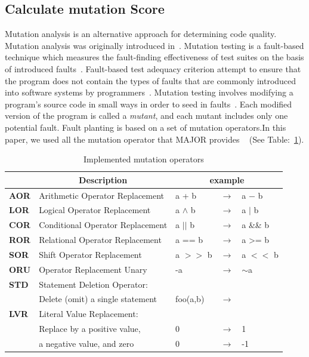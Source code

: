 \documentclass[conference]{IEEEtran}
\begin{document}
\subsection{Calculate mutation Score}
Mutation analysis is an alternative approach for determining code quality. Mutation analysis was originally introduced in~\cite{demillo1978hints,budd1980mutation}. Mutation testing is a fault-based technique which measures the fault-finding effectiveness of test suites on the basis of introduced faults~\cite{demillo1978hints,hamlet1977testing}. Fault-based test adequacy criterion attempt to ensure that the program does not contain the types of faults that are commonly introduced into software systems by programmers~\cite{demillo1978hints}. Mutation testing involves modifying a program's source code in small ways in order to seed in faults~\cite{offutt1994practical}. Each modified version of the program is called a \textit{mutant}, and each mutant includes only one potential fault. Fault planting is based on a set of mutation operators.In this paper, we used all the mutation operator that MAJOR provides ~\cite{just2011major} (See Table:~\ref{table:mutationOpertors}).

\begin{table}[htbp]
\caption{Implemented mutation operators}
\label{table:mutationOpertors}
\begin{tabular}{l l l l l }
\hline
 & \multicolumn{1}{c}{\textbf{Description}} & \multicolumn{ 3}{c}{\textbf{example}} \\ \hline
\textbf{AOR} & Arithmetic Operator Replacement & a + b & \(\to\) & a \(-\) b \\ 
\textbf{LOR} & Logical Operator Replacement & a \(\wedge\) b & \(\to\) & a \(|\) b \\ 
\textbf{COR} & Conditional Operator Replacement & a \(||\) b & \(\to\) & a \&\& b \\ 
\textbf{ROR} & Relational Operator Replacement & a == b & \(\to\) & a \textgreater = b \\ 
\textbf{SOR} & Shift Operator Replacement & a \(>>\) b & \(\to\) & a \(<<\) b \\ \hline
\textbf{ORU} & Operator Replacement Unary & -a & \(\to\) & \(\sim\)a \\ \hline
\textbf{STD} & Statement Deletion Operator:  &  &  &  \\
\textbf{} & Delete (omit) a single statement & foo(a,b) & \(\to\) & \(<no-op>\) \\ \hline
\textbf{LVR} & Literal Value Replacement:  &  &  &  \\ 
\textbf{} & Replace by a positive value, & 0 & \(\to\) & 1 \\
\textbf{} & a negative value, and zero & 0 & \(\to\) & -1 \\ \hline
\end{tabular}
\end{table}
\end{document}

